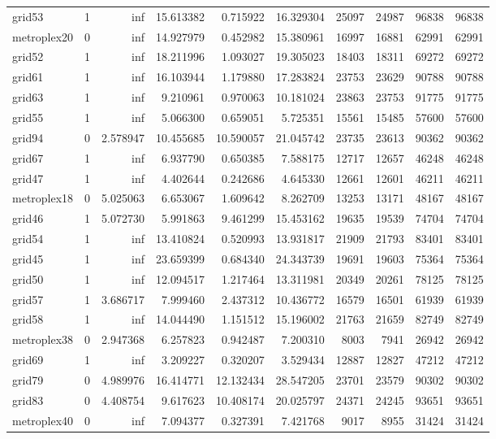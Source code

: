\begin{longtable}{|l|r|r|r|r|r|r|r|r|r|}
grid53 & 1 & inf & 15.613382 & 0.715922 & 16.329304 & 25097 & 24987 & 96838 & 96838 \\
metroplex20 & 0 & inf & 14.927979 & 0.452982 & 15.380961 & 16997 & 16881 & 62991 & 62991 \\
grid52 & 1 & inf & 18.211996 & 1.093027 & 19.305023 & 18403 & 18311 & 69272 & 69272 \\
grid61 & 1 & inf & 16.103944 & 1.179880 & 17.283824 & 23753 & 23629 & 90788 & 90788 \\
grid63 & 1 & inf & 9.210961 & 0.970063 & 10.181024 & 23863 & 23753 & 91775 & 91775 \\
grid55 & 1 & inf & 5.066300 & 0.659051 & 5.725351 & 15561 & 15485 & 57600 & 57600 \\
grid94 & 0 & 2.578947 & 10.455685 & 10.590057 & 21.045742 & 23735 & 23613 & 90362 & 90362 \\
grid67 & 1 & inf & 6.937790 & 0.650385 & 7.588175 & 12717 & 12657 & 46248 & 46248 \\
grid47 & 1 & inf & 4.402644 & 0.242686 & 4.645330 & 12661 & 12601 & 46211 & 46211 \\
metroplex18 & 0 & 5.025063 & 6.653067 & 1.609642 & 8.262709 & 13253 & 13171 & 48167 & 48167 \\
grid46 & 1 & 5.072730 & 5.991863 & 9.461299 & 15.453162 & 19635 & 19539 & 74704 & 74704 \\
grid54 & 1 & inf & 13.410824 & 0.520993 & 13.931817 & 21909 & 21793 & 83401 & 83401 \\
grid45 & 1 & inf & 23.659399 & 0.684340 & 24.343739 & 19691 & 19603 & 75364 & 75364 \\
grid50 & 1 & inf & 12.094517 & 1.217464 & 13.311981 & 20349 & 20261 & 78125 & 78125 \\
grid57 & 1 & 3.686717 & 7.999460 & 2.437312 & 10.436772 & 16579 & 16501 & 61939 & 61939 \\
grid58 & 1 & inf & 14.044490 & 1.151512 & 15.196002 & 21763 & 21659 & 82749 & 82749 \\
metroplex38 & 0 & 2.947368 & 6.257823 & 0.942487 & 7.200310 & 8003 & 7941 & 26942 & 26942 \\
grid69 & 1 & inf & 3.209227 & 0.320207 & 3.529434 & 12887 & 12827 & 47212 & 47212 \\
grid79 & 0 & 4.989976 & 16.414771 & 12.132434 & 28.547205 & 23701 & 23579 & 90302 & 90302 \\
grid83 & 0 & 4.408754 & 9.617623 & 10.408174 & 20.025797 & 24371 & 24245 & 93651 & 93651 \\
metroplex40 & 0 & inf & 7.094377 & 0.327391 & 7.421768 & 9017 & 8955 & 31424 & 31424 \\

\end{longtable}
